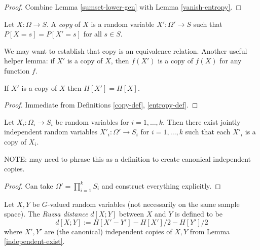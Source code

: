 \begin{proof}  Combine Lemma \ref{sumset-lower-gen} with Lemma \ref{vanish-entropy}.
\end{proof}

\begin{definition}[Copy]\label{copy-def}
  Let $X : \Omega \to S$.  A \emph{copy} of $X$ is a random variable $X' : \Omega' \to S$ such that $P[X=s] = P[X'=s]$ for all $s \in S$.
\end{definition}

We may want to establish that copy is an equivalence relation. Another useful helper lemma: if $X'$ is a copy of $X$, then $f(X')$ is a copy of $f(X)$ for any function $f$.

\begin{lemma}\label{copy-ent}
  If $X'$ is a copy of $X$ then $H[X'] = H[X]$.
\end{lemma}

\begin{proof} Immediate from Definitions \ref{copy-def}, \ref{entropy-def}.
\end{proof}

\begin{lemma}\label{independent-exist}
  Let $X_i : \Omega_i \to S_i$ be random variables for $i=1,\dots,k$.  Then there exist jointly independent random variables $X'_i: \Omega' \to S_i$ for $i=1,\dots,k$ such that each $X'_i$ is a copy of $X_i$.
\end{lemma}

NOTE: may need to phrase this as a definition to create canonical independent copies.

\begin{proof} Can take $\Omega' = \prod_{i=1}^k S_i$ and construct everything explicitly.
\end{proof}

\begin{definition}\label{ruz-dist-def}
  Let $X,Y$ be $G$-valued random variables (not necessarily on the same sample space).  The \emph{Ruzsa distance} $d[X;Y]$ between $X$ and $Y$ is defined to be
$$ d[X;Y] := H[X' - Y'] - H[X']/2 - H[Y']/2$$
where $X',Y'$ are (the canonical) independent copies of $X,Y$ from Lemma \ref{independent-exist}.
\end{definition}

